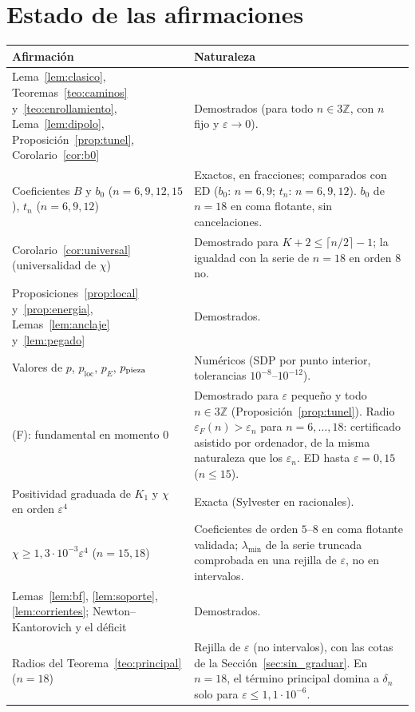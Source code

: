 \documentclass[11pt,a4paper]{article}
\theoremstyle{definition}
\theoremstyle{remark}
\newcommand{\eps}{\varepsilon}
\newcommand{\pE}{p_{E}}
\newcommand{\ploc}{p_{\mathrm{loc}}}
\begin{document}
\section{Estado de las afirmaciones}\label{sec:estado}

\begin{center}
\begin{tabular}{>{\raggedright}p{6.2cm}>{\raggedright\arraybackslash}p{8.3cm}}
\toprule
Afirmación & Naturaleza\\
\midrule
Lema~\ref{lem:clasico}, Teoremas~\ref{teo:caminos} y~\ref{teo:enrollamiento}, Lema~\ref{lem:dipolo},
Proposición~\ref{prop:tunel}, Corolario~\ref{cor:b0} &
Demostrados (para todo $n\in3\mathbb Z$, con $n$ fijo y $\eps\to0$).\\
Coeficientes $B$ y $b_0$ ($n=6,9,12,15$), $t_n$ ($n=6,9,12$) & Exactos, en fracciones; comparados con ED
($b_0$: $n=6,9$; $t_n$: $n=6,9,12$). $b_0$ de $n=18$ en coma flotante, sin cancelaciones.\\
Corolario~\ref{cor:universal} (universalidad de $\chi$) & Demostrado para $K+2\le\lceil n/2\rceil-1$; la
igualdad con la serie de $n=18$ en orden $8$ no.\\
Proposiciones~\ref{prop:local} y~\ref{prop:energia}, Lemas~\ref{lem:anclaje} y~\ref{lem:pegado} &
Demostrados.\\
Valores de $p$, $\ploc$, $\pE$, $p_{\rm pieza}$ & Numéricos (SDP por punto interior, tolerancias
$10^{-8}$--$10^{-12}$).\\
(F): fundamental en momento $0$ & Demostrado para $\eps$ pequeño y todo $n\in3\mathbb Z$
(Proposición~\ref{prop:tunel}). Radio $\eps_F(n)>\eps_n$ para $n=6,\dots,18$: certificado asistido por
ordenador, de la misma naturaleza que los $\eps_n$. ED hasta $\eps=0{,}15$ ($n\le15$).\\
Positividad graduada de $K_1$ y $\chi$ en orden $\eps^4$ & Exacta (Sylvester en racionales).\\
$\chi\ge1{,}3\cdot10^{-3}\eps^4$ ($n=15,18$) & Coeficientes de orden $5$--$8$ en coma flotante validada;
$\lambda_{\min}$ de la serie truncada comprobada en una rejilla de $\eps$, no en intervalos.\\
Lemas~\ref{lem:bf}, \ref{lem:soporte}, \ref{lem:corrientes}; Newton--Kantorovich y el déficit & Demostrados.\\
Radios del Teorema~\ref{teo:principal} ($n=18$) & Rejilla de $\eps$ (no intervalos), con las cotas de la Sección~\ref{sec:sin_graduar}. En $n=18$, el término principal domina a $\delta_n$ solo para $\eps\le1{,}1\cdot10^{-6}$.\\

\end{tabular}
\end{center}
\end{document}

